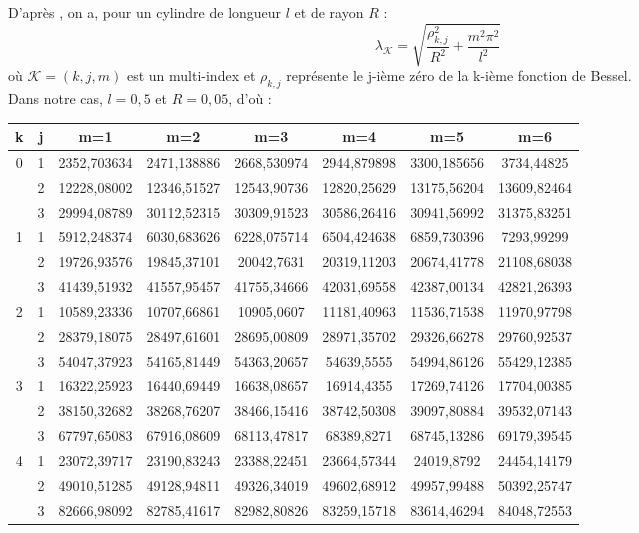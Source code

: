 D'après \cite{Saks2005}, on a, pour un cylindre de longueur $l$ et de rayon $R$ :
\[
\lambda_\mathcal{K} = \sqrt{\frac{\rho_{k,j}^2}{R^2} + \frac{m^2\pi^2}{l^2}}
\]
où $\mathcal{K}=(k,j,m)$ est un multi-index et $\rho_{k,j}$ représente le j-ième zéro de la k-ième fonction de Bessel.\\
Dans notre cas, $l=0,5$ et $R=0,05$, d'où :\\
\begin{center}
\begin{tabular}{|*{8}{c|}}
\hline
k & j & m=1 & m=2 & m=3 & m=4 & m=5 & m=6\\
\hline
\multirow{3}{*}{0}
& 1 & 2352,703634&2471,138886&2668,530974&2944,879898&3300,185656&3734,44825\\
& 2 & 12228,08002&12346,51527&12543,90736&12820,25629&13175,56204&13609,82464\\
& 3 & 29994,08789&30112,52315&30309,91523&30586,26416&30941,56992&31375,83251\\
\hline
\multirow{3}{*}{1}
& 1 &5912,248374&6030,683626&6228,075714&6504,424638&6859,730396&7293,99299\\
& 2 &19726,93576&19845,37101&20042,7631&20319,11203&20674,41778&21108,68038\\
& 3 &41439,51932&41557,95457&41755,34666&42031,69558&42387,00134&42821,26393\\ \hline
\multirow{3}{*}{2}
& 1 &10589,23336&10707,66861&10905,0607&11181,40963&11536,71538&11970,97798\\
& 2 &28379,18075&28497,61601&28695,00809&28971,35702&29326,66278&29760,92537\\
& 3 &54047,37923&54165,81449&54363,20657&54639,5555&54994,86126&55429,12385\\
\hline
\multirow{3}{*}{3}
& 1 &16322,25923&16440,69449&16638,08657&16914,4355&17269,74126&17704,00385\\
& 2 &38150,32682&38268,76207&38466,15416&38742,50308&39097,80884&39532,07143\\
& 3 &67797,65083&67916,08609&68113,47817&68389,8271&68745,13286&69179,39545\\
\hline
\multirow{3}{*}{4}
& 1 &23072,39717&23190,83243&23388,22451&23664,57344&24019,8792&24454,14179\\
& 2 &49010,51285&49128,94811&49326,34019&49602,68912&49957,99488&50392,25747\\
& 3 &82666,98092&82785,41617&82982,80826&83259,15718&83614,46294&84048,72553\\
\hline
\end{tabular}
\end{center}

